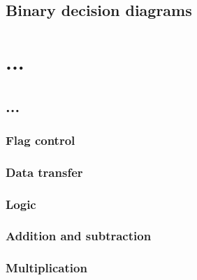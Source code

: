 \documentclass[a4paper,11pt]{kth-mag}
\begin{document}
\cite{crick_thesis}

\section{Binary decision diagrams}

\chapter{...}


\section{...}

\subsection{Flag control}


\subsection{Data transfer}


\subsection{Logic}


\subsection{Addition and subtraction}


\subsection{Multiplication}





\appendix
\addappheadtotoc
\end{document}
